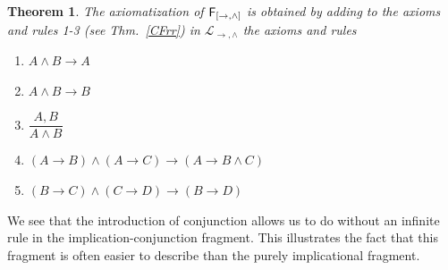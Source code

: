 \documentclass[12pt]{article}
\newtheorem{thm}{Theorem}[section]
\begin{document}
\begin{thm} The axiomatization of $ {\sf F_{[\rightarrow, \wedge]}}  $ is obtained by adding to the axioms and rules 1-3 (see Thm.\ \ref{CFrr}) in $\mathcal{L}_{\rightarrow,\wedge}$ the axioms and rules
\begin{enumerate}
\item[5. ] $A\wedge B \rightarrow A$
\item[6. ] $ A\wedge B \rightarrow B$
\item[7. ] $\dfrac{A,B}{A\wedge B}$
\item[8. ] $(A\rightarrow B)\wedge(A\rightarrow C)\rightarrow(A\rightarrow B\wedge C)$
\item[9. ] $(B\rightarrow C)\wedge(C\rightarrow D)\rightarrow(B\rightarrow D)$
\end{enumerate}
\end{thm}

We see that the introduction of conjunction allows us to do without an infinite rule in the implication-conjunction fragment. This illustrates the fact that this fragment is often easier to describe than the purely implicational fragment.
\end{document}
